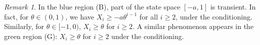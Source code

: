\documentclass[12pt]{article}
\newcommand{\1}{\mathds{1}}
\theoremstyle{definition}
\theoremstyle{plain}
\theoremstyle{remark}
\newtheorem{Remark}{Remark}
\begin{document}
\begin{Remark}
In the blue region (B), part of the state space $[-a,1]$ is transient. In fact, for $\theta\in(0,1)$, we have $X_i\geq -a \theta^{i-1}$ for all $i\geq 2$, under the conditioning. Similarly, for $\theta\in[-1,0)$, $X_i \geq \theta$ for $i\geq 2$.  A similar phenomenon appears in the green region (G): $X_i\geq \theta$ for $i\geq 2$ under the conditioning.
\end{Remark}

\end{document}

